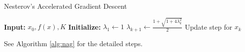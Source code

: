 \documentclass{article}
\begin{document}
\begin{algorithm}[H]
    \caption{Nesterov's Accelerated Gradient Descent} \label{alg:nag}
    \begin{algorithmic}[1]
        \State \textbf{Input:} $x_0, f(x), K$
        \State \textbf{Initialize:} $\lambda_1 \gets 1$
            \State $\lambda_{k+1} \gets \frac{1 + \sqrt{1 + 4\lambda_k^2}}{2}$
            \State Update step for $x_k$
        \EndFor
    \end{algorithmic}
\end{algorithm}

See Algorithm \ref{alg:nag} for the detailed steps.
\end{document}
